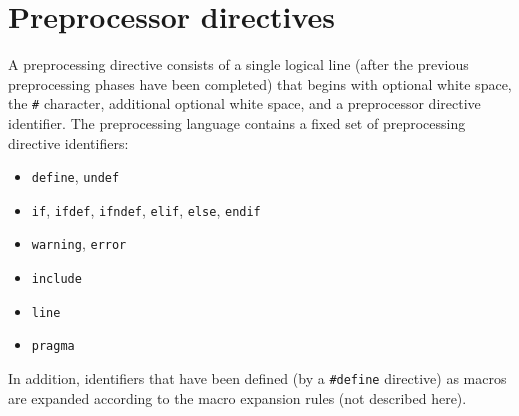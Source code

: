\section{Preprocessor directives}
A preprocessing directive consists of a single logical line (after the previous preprocessing phases have been completed) that begins with optional white space, the \verb|#| character, additional optional white space, and a preprocessor directive identifier.
The preprocessing language contains a fixed set of preprocessing directive identifiers:
\begin{itemize}
	\item \texttt{define}, \texttt{undef}
	\item \texttt{if}, \texttt{ifdef}, \texttt{ifndef}, \texttt{elif}, \texttt{else}, \texttt{endif}
	\item \texttt{warning}, \texttt{error}
	\item \texttt{include}
	\item \texttt{line}
	\item \texttt{pragma}
\end{itemize}
In addition, identifiers that have been defined (by a \texttt{\#define} directive) as macros are expanded according to the macro expansion rules (not described here).

